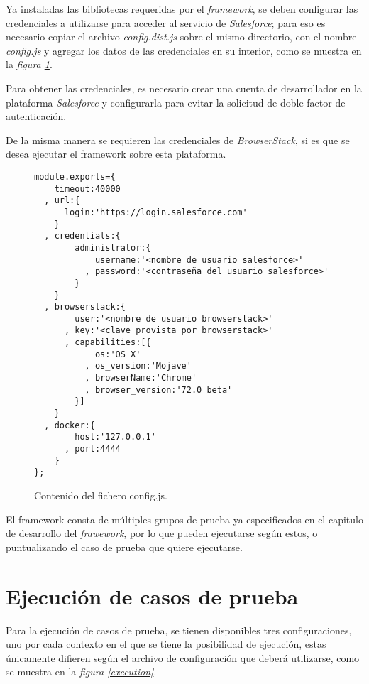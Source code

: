 Ya instaladas las bibliotecas requeridas por el \emph{framework}, se deben
configurar las credenciales a utilizarse para acceder al servicio de
\emph{Salesforce}; para eso es necesario copiar el archivo \emph{config.dist.js}
sobre el mismo directorio, con el nombre \emph{config.js} y agregar los datos de
las credenciales en su interior, como se muestra en la \emph{figura
\ref{config}}.

Para obtener las credenciales, es necesario crear una cuenta de desarrollador en
la plataforma \emph{Salesforce} y configurarla para evitar la solicitud de doble
factor de autenticación.

De la misma manera se requieren las credenciales de \emph{BrowserStack}, si es
que se desea ejecutar el framework sobre esta plataforma.

\begin{figure}[H]
\footnotesize
\begin{verbatim}
module.exports={
    timeout:40000
  , url:{
      login:'https://login.salesforce.com'
    }
  , credentials:{
        administrator:{
            username:'<nombre de usuario salesforce>'
          , password:'<contraseña del usuario salesforce>'
        }
    }
  , browserstack:{
        user:'<nombre de usuario browserstack>'
      , key:'<clave provista por browserstack>'
      , capabilities:[{
            os:'OS X'
          , os_version:'Mojave'
          , browserName:'Chrome'
          , browser_version:'72.0 beta'
        }]
    }
  , docker:{
        host:'127.0.0.1'
      , port:4444
    }
};
\end{verbatim}
\caption{Contenido del fichero config.js.}
\label{config}
\end{figure}

El framework consta de múltiples grupos de prueba ya especificados en el
capitulo de desarrollo del \emph{frawework}, por lo que pueden ejecutarse según
estos, o puntualizando el caso de prueba que quiere ejecutarse.

\section{Ejecución de casos de prueba}
Para la ejecución de casos de prueba, se tienen disponibles tres
configuraciones, uno por cada contexto en el que se tiene la posibilidad de
ejecución, estas únicamente difieren según el archivo de configuración que
deberá utilizarse, como se muestra en la \emph{figura \ref{execution}}.

